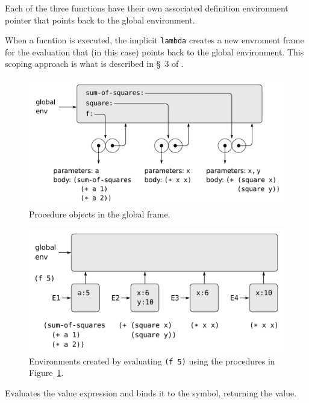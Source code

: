 \documentclass[12pt]{article}
\begin{document}
Each of the three functions have their own associated definition
environment pointer that points back to the global environment.

When a fucntion is executed, the implicit \verb|lambda| creates a new
envroment frame for the evaluation that (in this case) points back to
the global environment. This scoping approach is what is described in
\S~3 of \cite{sicp}.

\begin{figure}[htbp] %
   \centering
   \includegraphics[width=5in]{function_declarations.png} 
\caption{Procedure objects in the global frame.}
\label{fig:funcdefs}
\end{figure}

\begin{figure}[htbp] %
   \centering
   \includegraphics[width=5in]{function_invocations.png} 
\caption[Invocation Environments]{Environments created by evaluating
  {\tt (f 5)} using the procedures in Figure~\ref{fig:funcdefs}.}
\label{fig:funcinvocations}
\end{figure}



Evaluates the value expression and binds it to the symbol, returning
the value. 
\end{document}
